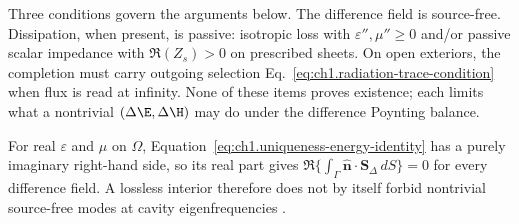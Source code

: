 Three conditions govern the arguments below. The difference field is source-free. Dissipation, when present, is passive: isotropic loss with $\varepsilon'',\mu''\ge0$ and/or passive scalar impedance with $\Re(Z_s)>0$ on prescribed sheets. On open exteriors, the completion must carry outgoing selection Eq.~\eqref{eq:ch1.radiation-trace-condition} when flux is read at infinity. None of these items proves existence; each limits what a nontrivial $(\Delta\E,\Delta\H)$ may do under the difference Poynting balance.

For real $\varepsilon$ and $\mu$ on $\Omega$, Equation~\eqref{eq:ch1.uniqueness-energy-identity} has a purely imaginary right-hand side, so its real part gives $\Re\{\int_{\Gamma}\hat{\mathbf{n}}\cdot\mathbf{S}_\Delta\,dS\}=0$ for every difference field. A lossless interior therefore does not by itself forbid nontrivial source-free modes at cavity eigenfrequencies \cite{stratton1941}.

